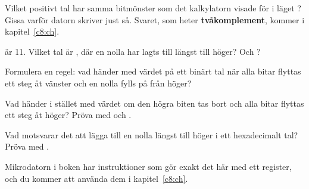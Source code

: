 Vilket positivt tal har samma bitmönster som det kalkylatorn visade för  i läget
? Gissa varför datorn skriver  just så. Svaret, som heter
\textbf{tvåkomplement}, kommer i kapitel~\ref{c8:ch}.

\label{c1:ex:14}
\begin{parts}
  \item {} är 11. Vilket tal är , där en nolla har lagts till längst till
    höger? Och ?
  \item Formulera en regel: vad händer med värdet på ett binärt tal när alla bitar flyttas ett steg
    åt vänster och en nolla fylls på från höger?
  \item Vad händer i stället med värdet om den högra biten tas bort och alla bitar flyttas ett steg
    åt höger? Pröva med  och .
  \item Vad motsvarar det att lägga till en nolla längst till höger i ett hexadecimalt tal? Pröva
    med .
\end{parts}
Mikrodatorn i boken har instruktioner som gör exakt det här med ett register, och du kommer att
använda dem i kapitel~\ref{c8:ch}.
